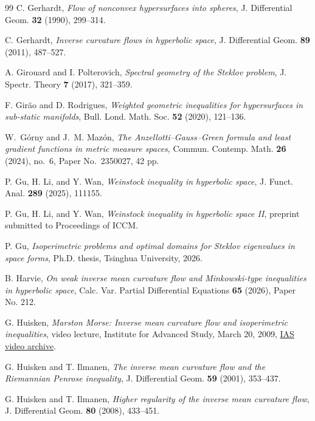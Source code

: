 \documentclass[11pt,reqno]{amsart}
\numberwithin{equation}{section}
\theoremstyle{definition}
\begin{document}
\begin{thebibliography}{99}
C. Gerhardt,
\emph{Flow of nonconvex hypersurfaces into spheres},
J. Differential Geom. \textbf{32} (1990), 299--314.

C. Gerhardt,
\emph{Inverse curvature flows in hyperbolic space},
J. Differential Geom. \textbf{89} (2011), 487--527.

A. Girouard and I. Polterovich,
\emph{Spectral geometry of the Steklov problem},
J. Spectr. Theory \textbf{7} (2017), 321--359.

F. Gir\~ao and D. Rodrigues,
\emph{Weighted geometric inequalities for hypersurfaces in sub-static manifolds},
Bull. Lond. Math. Soc. \textbf{52} (2020), 121--136.

W.~G{\'o}rny and J.~M. Maz{\'o}n,
\emph{The Anzellotti--Gauss--Green formula and least gradient
functions in metric measure spaces},
Commun. Contemp. Math. \textbf{26} (2024), no.~6,
Paper No.~2350027, 42 pp.

P. Gu, H. Li, and Y. Wan,
\emph{Weinstock inequality in hyperbolic space},
J. Funct. Anal. \textbf{289} (2025), 111155.

P. Gu, H. Li, and Y. Wan,
\emph{Weinstock inequality in hyperbolic space II}, preprint submitted to Proceedings of ICCM. 

P. Gu,
\emph{Isoperimetric problems and optimal domains for Steklov eigenvalues in space forms},
Ph.D. thesis, Tsinghua University, 2026.

B. Harvie,
\emph{On weak inverse mean curvature flow and Minkowski-type inequalities in hyperbolic space},
Calc. Var. Partial Differential Equations \textbf{65} (2026), Paper No. 212.

G. Huisken,
\emph{Marston Morse: Inverse mean curvature flow and isoperimetric inequalities},
video lecture, Institute for Advanced Study, March 20, 2009,
\href{https://www.ias.edu/video/marston-morse-inverse-mean-curvature-flow-and-isoperimetric-inequalities}{IAS video archive}.


G. Huisken and T. Ilmanen,
\emph{The inverse mean curvature flow and the Riemannian Penrose inequality},
J. Differential Geom. \textbf{59} (2001), 353--437.

G. Huisken and T. Ilmanen,
\emph{Higher regularity of the inverse mean curvature flow},
J. Differential Geom. \textbf{80} (2008), 433--451.


\end{thebibliography}
\end{document}
